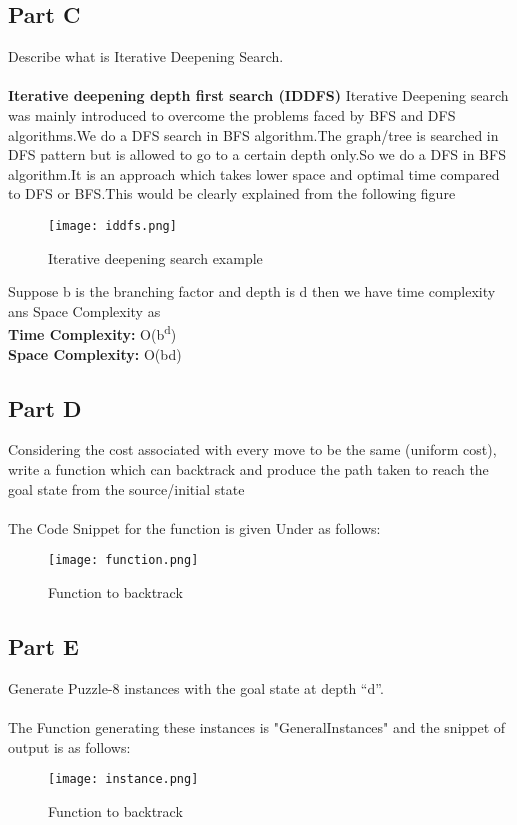 \documentclass[conference]{IEEEtran}
\begin{document}
\subsection{Part C}
Describe what is Iterative Deepening Search.
\\
\\
\textbf{Iterative deepening depth first search (IDDFS)} Iterative Deepening search was mainly introduced to overcome the problems faced by BFS and DFS algorithms.We do a DFS search in BFS algorithm.The graph/tree is searched in DFS pattern but is allowed to go to a certain depth only.So we do a DFS in BFS algorithm.It is an approach which takes lower space and  optimal time compared to DFS or BFS.This would be clearly explained from the following figure\cite{b1}
\begin{figure}[htbp]
\centerline{\texttt{[image: iddfs.png]}}
\caption{Iterative deepening search example\cite{b7}}
\label{fig}
\end{figure}
Suppose b is the branching factor and depth is d then we have time complexity ans Space Complexity as
\\
\textbf{Time Complexity:} O(b\textsuperscript{d})
\\
\textbf{Space Complexity:} O(bd)
\\
\subsection{Part D}
Considering the cost associated with every move to be the
same (uniform cost), write a function which can backtrack
and produce the path taken to reach the goal state from the
source/initial state
\\
\\
The Code Snippet for the function is given Under as follows:
\begin{figure}[htbp]
\centerline{\texttt{[image: function.png]}}
\caption{Function to backtrack}
\label{fig}
\end{figure}

\subsection{Part E}
\newline
Generate Puzzle-8 instances with the goal state at depth “d”.
\\
\\
The Function generating these instances is "GeneralInstances" and the snippet of output is as follows:
\begin{figure}[htbp]
\centerline{\texttt{[image: instance.png]}}
\caption{Function to backtrack}
\label{fig}
\end{figure}
\end{document}
